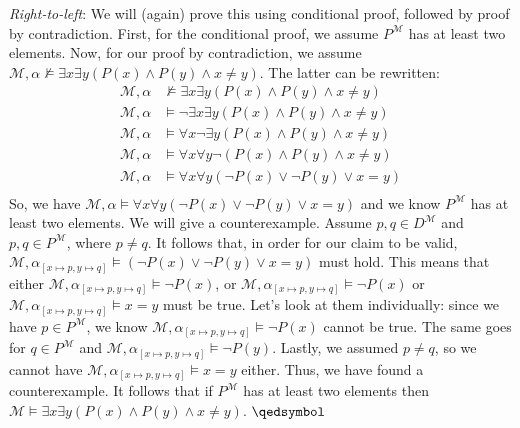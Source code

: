 \begin{enumerate}
\begin{enumerate}[(1)]
    \end{enumerate}

    \emph{Right-to-left}:
    We will (again) prove this using conditional proof, followed by proof by contradiction.
    First, for the conditional proof, we assume $P^\mathcal{M}$ has at least two elements.
    Now, for our proof by contradiction, we assume $\mathcal{M}, \alpha \nvDash \exists x \exists y (P(x) \wedge P(y) \wedge x \neq y)$.
    The latter can be rewritten:
    \begin{align*}
        \mathcal{M}, \alpha & \nvDash \exists x \exists y (P(x) \wedge P(y) \wedge x \neq y) \\
        \mathcal{M}, \alpha & \vDash \neg \exists x \exists y (P(x) \wedge P(y) \wedge x \neq y) \\
        \mathcal{M}, \alpha & \vDash \forall x \neg \exists y (P(x) \wedge P(y) \wedge x \neq y) \\
        \mathcal{M}, \alpha & \vDash \forall x \forall y \neg (P(x) \wedge P(y) \wedge x \neq y) \\
        \mathcal{M}, \alpha & \vDash \forall x \forall y (\neg P(x) \vee \neg P(y) \vee x = y) \\
    \end{align*} 
    So, we have
    $\mathcal{M}, \alpha \vDash \forall x \forall y (\neg P(x) \vee \neg P(y) \vee x = y)$
    and we know $P^\mathcal{M}$ has at least two elements.
    We will give a counterexample.
    Assume $p, q \in D^\mathcal{M}$ and $p, q \in P^\mathcal{M}$, where $p \neq q$.
    It follows that, in order for our claim to be valid,
    $\mathcal{M}, \alpha_{[x \mapsto p, y \mapsto q]} \vDash (\neg P(x) \vee \neg P(y) \vee x = y)$
    must hold.
    This means that either
    $\mathcal{M}, \alpha_{[x \mapsto p, y \mapsto q]} \vDash \neg P(x)$,
    or
    $\mathcal{M}, \alpha_{[x \mapsto p, y \mapsto q]} \vDash \neg P(x)$
    or
    $\mathcal{M}, \alpha_{[x \mapsto p, y \mapsto q]} \vDash x = y$
    must be true.
    Let's look at them individually: since we have $p \in P^\mathcal{M}$, we know
    $\mathcal{M}, \alpha_{[x \mapsto p, y \mapsto q]} \vDash \neg P(x)$
    cannot be true.
    The same goes for $q \in P^\mathcal{M}$ and
    $\mathcal{M}, \alpha_{[x \mapsto p, y \mapsto q]} \vDash \neg P(y)$.
    Lastly, we assumed $p \neq q$, so we cannot have
    $\mathcal{M}, \alpha_{[x \mapsto p, y \mapsto q]} \vDash x = y$
    either.
    Thus, we have found a counterexample.
    It follows that if $P^{\mathcal{M}}$ has at least two elements then
    $\mathcal{M} \vDash \exists x \exists y (P(x) \wedge P(y) \wedge x \neq y)$.
    $\qedsymbol$
\end{enumerate}

